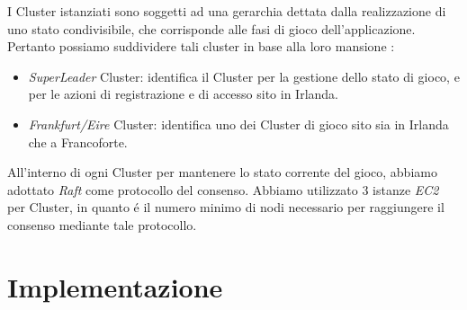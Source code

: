 \documentclass{sig-alternate-05-2015}
\begin{document}
I Cluster istanziati sono soggetti ad una gerarchia dettata dalla realizzazione di uno stato condivisibile, che corrisponde alle fasi di gioco dell'applicazione.
Pertanto possiamo suddividere tali cluster in base alla loro mansione :
\begin{itemize}
\item \textit{SuperLeader} Cluster: identifica il Cluster per la gestione dello stato di gioco, e per le azioni di registrazione e di accesso sito in Irlanda.
\item \textit{Frankfurt/Eire} Cluster: identifica uno dei Cluster di gioco sito sia in Irlanda che a Francoforte.
\end{itemize}
All'interno di ogni Cluster per mantenere lo stato corrente del gioco, abbiamo adottato \textit{Raft} come protocollo del consenso. Abbiamo utilizzato 3 istanze \textit{EC2} per Cluster, in quanto \'e il numero minimo di nodi necessario per raggiungere il consenso mediante tale protocollo.

\begin{comment}

\subsubsection{Superleader Cluster}

Tale Cluster si occupa della elaborazione dello stato corrente di gioco, e della notifica  del cambiamento di stato verso gli altri Cluster mediante il servizio SNS. 
Sfrutta il servizio offerto da DynamoDB per memorizzare i dati di registrazione dell'utente.


\subsubsection{Frankfurt/Eire Cluster}


Entrambi i Cluster svolgono le medesime attivit\'a, in quanto ricevono entrambi gli aggiornamenti dello stato attraverso il servizio di SNS.
Raccolgono le azioni di gioco prodotte dagli utenti durante le fasi di gioco, salvandole momentaneamente all'interno dell'apposita cache, la quale sfrutta il servizio Redis. 
Contattano il servizio DynamoDB per ottenere sempre i dati aggiornati dei vari giocatori, successivamente notificano al SuperLeader Cluster il completamento dell'esecuzione della fase.

\end{comment}

\section{Implementazione}
\end{document}
